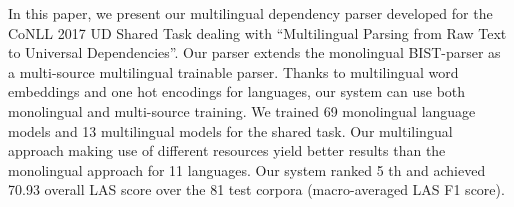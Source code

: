 In this paper, we present our multilingual dependency parser developed for the CoNLL 2017 UD Shared Task dealing with ``Multilingual Parsing from Raw Text to Universal Dependencies''. Our parser extends the monolingual BIST-parser as a multi-source multilingual trainable parser. Thanks to multilingual word embeddings and one hot encodings for languages, our system can use both monolingual and multi-source training. We trained 69 monolingual language models and 13 multilingual models for the shared task. Our multilingual approach making use of different resources yield better results than the monolingual approach for 11 languages. Our system ranked 5 th and achieved 70.93 overall LAS score over the 81 test corpora (macro-averaged LAS F1 score).
